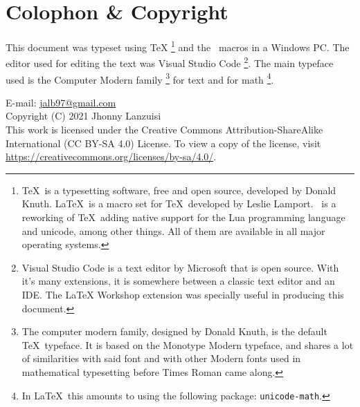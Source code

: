 \newpage
\section*{Colophon \& Copyright}
This document was typeset using \TeX%
\footnote{%
    \TeX\ is
    a typesetting software, free and open source,
    developed by Donald Knuth. \LaTeX\ is a macro
    set for \TeX\ developed by Leslie Lamport. \LuaTeX\ is
    a reworking of \TeX\ adding native support for the Lua
    programming language and unicode, among other things.
    All of them are available in all major
    operating systems.
}
and the \LaTeXe\ macros in a Windows PC.
The editor used for editing the text was Visual Studio Code%
\footnote{%
    Visual Studio Code is a text editor by Microsoft
    that is open source. With it's many extensions, it is somewhere between
    a classic text editor and an IDE. The LaTeX Workshop extension was
    specially useful in producing this document.
}.
The main typeface used is the Computer Modern family%
\footnote{%
    The computer modern family, designed by Donald Knuth,
    is the default \TeX\ typeface. It is based on the
    Monotype Modern typeface, and shares a lot of similarities
    with said font and with other Modern fonts used in
    mathematical typesetting before Times Roman came along.
}
for text and for math%
\footnote{%
    In \LaTeX\ this amounts to using the following package:
    \texttt{unicode-math}.
}.

\medskip
%
\begingroup
\ttfamily\raggedright%
    E-mail: \url{jalb97@gmail.com} \\
    Copyright (C) 2021 Jhonny Lanzuisi \\
    This work is licensed under the Creative Commons Attribution-ShareAlike
    International (CC BY-SA 4.0)  License. To view a copy of the license,
    visit \url{https://creativecommons.org/licenses/by-sa/4.0/}.
\endgroup

